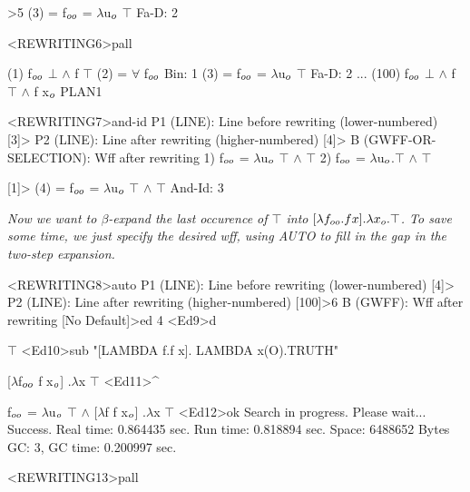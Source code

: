 \begin{tpsexample}
 [1]>5
(3)   =  f\(\sb{oo}\) = \(\lambda\)u\(\sb{o}\) \(\top\)                                                    Fa-D: 2

<REWRITING6>pall

(1)      f\(\sb{oo}\) \(\bot\) \(\land\) f \(\top\)
(2)   =  \(\forall\) f\(\sb{oo}\)                                                           Bin: 1
(3)   =  f\(\sb{oo}\) = \(\lambda\)u\(\sb{o}\) \(\top\)                                                    Fa-D: 2
               ...
(100)    f\(\sb{oo}\) \(\bot\) \(\land\) f \(\top\) \(\land\) f x\(\sb{o}\)                                               PLAN1

<REWRITING7>and-id
P1 (LINE): Line before rewriting  (lower-numbered) [3]>
P2 (LINE): Line after rewriting  (higher-numbered) [4]>
B (GWFF-OR-SELECTION): Wff after rewriting
 1)  f\(\sb{oo}\) = \(\lambda\)u\(\sb{o}\) \(\top\) \(\land\) \(\top\)
 2)  f\(\sb{oo}\) = \(\lambda\)u\(\sb{o}\).\(\top\) \(\land\) \(\top\)

 [1]>
(4)   =  f\(\sb{oo}\) = \(\lambda\)u\(\sb{o}\) \(\top\) \(\land\) \(\top\)                                              And-Id: 3

{\it Now we want to \(\beta\)-expand the last occurence of \(\top\) into \([\lambda f\sb{oo}.f x].\lambda x\sb{o}.\top\). To save some time, we just specify the desired wff, using AUTO to fill in the gap in the two-step expansion.}

<REWRITING8>auto
P1 (LINE): Line before rewriting  (lower-numbered) [4]>
P2 (LINE): Line after rewriting  (higher-numbered) [100]>6
B (GWFF): Wff after rewriting [No Default]>ed 4
<Ed9>d

\(\top\)
<Ed10>sub "[LAMBDA f.f x]. LAMBDA x(O).TRUTH"

[\(\lambda\)f\(\sb{oo}\) f x\(\sb{o}\)] .\(\lambda\)x \(\top\)
<Ed11>^

f\(\sb{oo}\) = \(\lambda\)u\(\sb{o}\) \(\top\) \(\land\) [\(\lambda\)f f x\(\sb{o}\)] .\(\lambda\)x \(\top\)
<Ed12>ok
Search in progress. Please wait...
Success.
Real time: 0.864435 sec.
Run time: 0.818894 sec.
Space: 6488652 Bytes
GC: 3, GC time: 0.200997 sec.

<REWRITING13>pall


\end{tpsexample}
